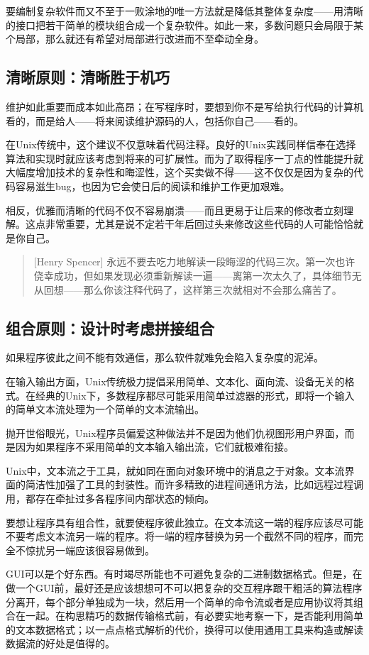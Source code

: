 \documentclass[12pt,oneside]{book}
\begin{document}
要编制复杂软件而又不至于一败涂地的唯一方法就是降低其整体复杂度——用清晰的接口把若干简单的模块组合成一个复杂软件。如此一来，多数问题只会局限于某个局部，那么就还有希望对局部进行改进而不至牵动全身。


\subsection{清晰原则：清晰胜于机巧}
维护如此重要而成本如此高昂；在写程序时，要想到你不是写给执行代码的计算机看的，而是给人——将来阅读维护源码的人，包括你自己——看的。

在Unix传统中，这个建议不仅意味着代码注释。良好的Unix实践同样信奉在选择算法和实现时就应该考虑到将来的可扩展性。而为了取得程序一丁点的性能提升就大幅度增加技术的复杂性和晦涩性，这个买卖做不得——这不仅仅是因为复杂的代码容易滋生bug，也因为它会使日后的阅读和维护工作更加艰难。

相反，优雅而清晰的代码不仅不容易崩溃——而且更易于让后来的修改者立刻理解。这点非常重要，尤其是说不定若干年后回过头来修改这些代码的人可能恰恰就是你自己。

\begin{quote}[Henry Spencer]
永远不要去吃力地解读一段晦涩的代码三次。第一次也许侥幸成功，但如果发现必须重新解读一遍——离第一次太久了，具体细节无从回想——那么你该注释代码了，这样第三次就相对不会那么痛苦了。
\end{quote}


\subsection{组合原则：设计时考虑拼接组合}
如果程序彼此之间不能有效通信，那么软件就难免会陷入复杂度的泥淖。

在输入输出方面，Unix传统极力提倡采用简单、文本化、面向流、设备无关的格式。在经典的Unix下，多数程序都尽可能采用简单过滤器的形式，即将一个输入的简单文本流处理为一个简单的文本流输出。

抛开世俗眼光，Unix程序员偏爱这种做法并不是因为他们仇视图形用户界面，而是因为如果程序不采用简单的文本输入输出流，它们就极难衔接。

Unix中，文本流之于工具，就如同在面向对象环境中的消息之于对象。文本流界面的简洁性加强了工具的封装性。而许多精致的进程间通讯方法，比如远程过程调用，都存在牵扯过多各程序间内部状态的倾向。

要想让程序具有组合性，就要使程序彼此独立。在文本流这一端的程序应该尽可能不要考虑文本流另一端的程序。将一端的程序替换为另一个截然不同的程序，而完全不惊扰另一端应该很容易做到。

GUI可以是个好东西。有时竭尽所能也不可避免复杂的二进制数据格式。但是，在做一个GUI前，最好还是应该想想可不可以把复杂的交互程序跟干粗活的算法程序分离开，每个部分单独成为一块，然后用一个简单的命令流或者是应用协议将其组合在一起。在构思精巧的数据传输格式前，有必要实地考察一下，是否能利用简单的文本数据格式；以一点点格式解析的代价，换得可以使用通用工具来构造或解读数据流的好处是值得的。
\end{document}
